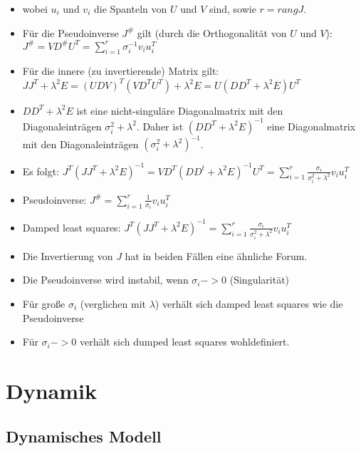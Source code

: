 \documentclass[paper=a4, fontsize=11pt]{scrartcl} %
\numberwithin{equation}{section} %
\numberwithin{figure}{section} %
\numberwithin{table}{section} %
\begin{document}
\begin{itemize}
\begin{itemize}
\item wobei $u_i$ und $v_i$ die Spanteln von $U$ und $V$ sind, sowie $r = rang J$.
\item Für die Pseudoinverse $J^\#$ gilt (durch die Orthogonalität von $U$ und $V$): $J^\# = V D^\# U^T = \sum_{i=1}^r \sigma_i^{-1} v_i u_i^T$
\item Für die innere (zu invertierende) Matrix gilt: $JJ^T + \lambda^2 E = (UDV)^T (VD^TU^T) + \lambda^2 E = U(DD^T + \lambda^2 E) U^T$
\item $DD^T + \lambda^2 E$ ist eine nicht-singuläre Diagonalmatrix mit den Diagonaleinträgen $\sigma_i^2 + \lambda^2$. Daher ist $(DD^T + \lambda^2 E)^{-1}$ eine Diagonalmatrix mit den Diagonaleinträgen $(\sigma_i^2 + \lambda^2)^{-1}$.
\item Es folgt: $J^T(JJ^T + \lambda^2 E)^{-1} = VD^T (DD^t + \lambda^2 E)^{-1} U^T = \sum_{i=1}^r \frac{\sigma_i}{\sigma_i^2 + \lambda^2} v_i u_i^T$
\item Pseudoinverse: $J^\# = \sum_{i=1}^r \frac{1}{\sigma_i} v_i u_i^T$
\item Damped least squares: $J^T(JJ^T + \lambda^2 E)^{-1} = \sum_{i=1}^r \frac{\sigma_i}{\sigma_i^2 + \lambda^2} v_i u_i^T$
\item Die Invertierung von $J$ hat in beiden Fällen eine ähnliche Forum.
\item Die Pseudoinverse wird instabil, wenn $\sigma_i -> 0$ (Singularität)
\item Für große $\sigma_i$ (verglichen mit $\lambda$) verhält sich damped least squares wie die Pseudoinverse
\item Für $\sigma_i -> 0$ verhält sich dumped least squares wohldefiniert.
\end{itemize}
\end{itemize}

\section{Dynamik}

\subsection{Dynamisches Modell}
\end{document}
